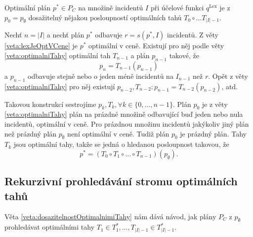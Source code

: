 \begin{veta}\label{veta:dosazitelnostOptimalnimiTahy}
  Optimální plán $p^* \in P_C$ na množině incidentů $I$ při účelové funkci $q^{\text{Lex}}$ je z $p_0 = p_{\emptyset}$
  dosažitelný nějakou posloupností optimálních tahů $T_0 \circ \dots T_{|I|-1}$.
\end{veta}
\begin{dukaz}
  Nechť $n = |I|$ a
  nechť plán $p^*$ odbavuje $r = s(p^*, I)$ incidentů.
  Z věty \ref{veta:lexJeOptVCene} je $p^*$ optimální v ceně.
  Existují pro něj podle věty \ref{veta:optimalniTahy} optimální tah $T_{n-1}$ a plán $p_{n-1}$ takové, že
  \begin{equation*}
    p_n = T_{n-1}(p_{n-1})
  \end{equation*}
  a $p_{n-1}$ odbavuje stejně nebo o jeden méně incidentů na $I_{n-1}$ než $r$.
  Opět z věty \ref{veta:optimalniTahy} pro něj existují $p_{n-2}, T_{n-2} \colon p_{n-1} = T_{n-2}(p_{n-2})$, atd.\

  Takovou konstrukcí sestrojíme $p_{k}, T_{k}, \forall k \in \{ 0, \dots, n-1 \}$. 
  Plán $p_0$ je z věty \ref{veta:optimalniTahy} plán na prázdné množině odbavující buď jeden nebo nula incidentů, optimální v ceně.
  Pro prázdnou množinu incidentů jakýkoliv jiný plán než prázdný plán $p_{\emptyset}$ není optimální v ceně.
  Tudiž plán $p_0$ je prázdný plán.
  Tahy $T_k$ jsou optimální tahy, takže se jedná o hledanou posloupnost takovou, že
  \begin{equation*}
    p^* = (T_0 \circ T_1 \circ \dots \circ T_{n-1})(p_{\emptyset}).
  \end{equation*}
\end{dukaz}

\subsection{Rekurzivní prohledávání stromu optimálních tahů}

Věta \ref{veta:dosazitelnostOptimalnimiTahy} nám dává návod, jak plány $P_C$ z $p_{\emptyset}$ prohledávat optimálními tahy $T_1 \in T^*_1, \dots , T_{|I| - 1} \in T^*_{|I|-1}$.

